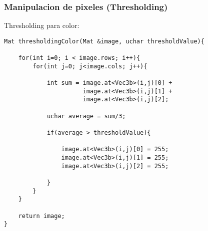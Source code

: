 \begin{frame}[fragile]
   \frametitle{Manipulacion de pixeles (Thresholding)}

   Thresholding para color:

    \scriptsize

    \begin{lstlisting}
Mat thresholdingColor(Mat &image, uchar thresholdValue){

    for(int i=0; i < image.rows; i++){
        for(int j=0; j<image.cols; j++){

            int sum = image.at<Vec3b>(i,j)[0] +
                      image.at<Vec3b>(i,j)[1] +
                      image.at<Vec3b>(i,j)[2];

            uchar average = sum/3;

            if(average > thresholdValue){

                image.at<Vec3b>(i,j)[0] = 255;
                image.at<Vec3b>(i,j)[1] = 255;
                image.at<Vec3b>(i,j)[2] = 255;

            }
        }
    }

    return image;
}
    \end{lstlisting}

\end{frame}
